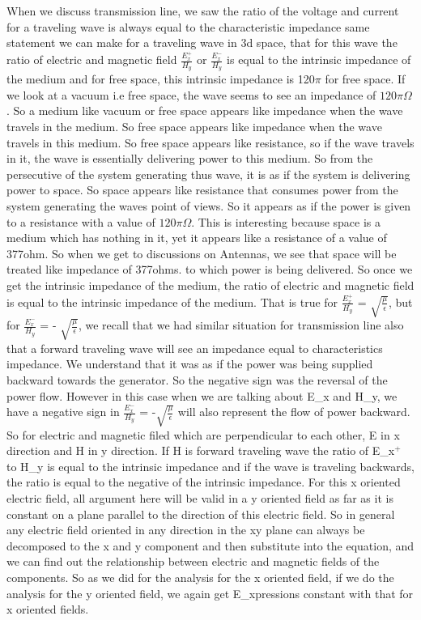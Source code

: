When we discuss transmission line, we saw the ratio of the voltage and current for a traveling wave is always equal to the characteristic impedance same statement we can make for a traveling wave in 3d space, that for this wave the ratio of electric and magnetic field $\frac{E_x^{+}}{H_y}$ or $\frac{E_x^{-}}{H_y}$ is equal to the intrinsic impedance of the medium and for free space, this intrinsic impedance is 120$\pi$ for free space. If we look at a vacuum i.e free space, the wave seems to see an impedance of $120\pi\Omega$. So a medium like vacuum or free space appears like impedance when the wave travels in the medium. So free space appears like impedance when the wave travels in this medium. So free space appears like resistance, so if the wave travels in it, the wave is essentially delivering power to this medium. So from the persecutive of the system generating thus wave, it is as if the system is delivering power to space. So space appears like resistance that consumes power from the system generating the waves point of views. So it appears as if the power is given to a resistance with a value of $120\pi\Omega$. This is interesting because space is a medium which has nothing in it, yet it appears like a resistance of a value of 377ohm. So when we get to discussions on Antennas, we see that space will be treated like impedance of 377ohms. to which power is being delivered. So once we get the intrinsic impedance of the medium, the ratio of electric and magnetic field is equal to the intrinsic impedance of the medium. That is  true for $\frac{E_x^+}{H_y}$ = $\sqrt{\frac{\mu}{\epsilon}}$, but for $\frac{E_x^-}{H_y}$ = - $\sqrt{\frac{\mu}{\epsilon}}$, we recall that we had similar situation for transmission line also that a forward traveling wave will see an impedance equal to characteristics impedance. We understand that it was as if the power was being supplied backward towards the generator. So the negative sign was the reversal of the power flow. However in this case when we are talking about E_x and H_y, we have a negative sign in $\frac{E_x^-}{H_y}$ = -$\sqrt{\frac{\mu}{\epsilon}}$ will also represent the flow of power backward. So for electric and magnetic filed which are perpendicular to each other, E in x direction and H in y direction. If H is forward traveling wave the ratio of E_x$^+$ to H_y is equal to the intrinsic impedance and if the wave is traveling backwards, the ratio is equal to the negative of the intrinsic impedance. For this x oriented electric field, all argument here will be valid in a y oriented field as far as it is constant on a plane parallel  to the direction of this electric field. So in general any electric field oriented in any direction in the xy plane can always be decomposed to the x and y component and then substitute into the equation, and we can find out the relationship between electric and magnetic fields of the components. So as we did for the analysis for the x oriented field, if we do the analysis for the y oriented field, we again get E_xpressions constant with that for x oriented fields.

